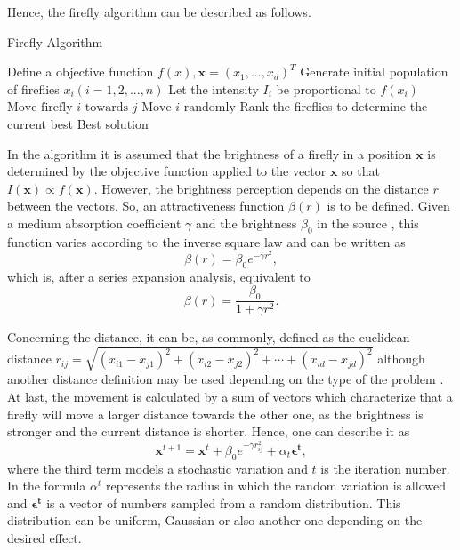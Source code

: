 \documentclass[tuberlin,cic,tc,openright,english,noabntcite,oneside]{iiufrgs}
\begin{document}
Hence, the firefly algorithm can be described as follows.
\begin{algorithm}[H]
\caption{Firefly Algorithm}
\begin{algorithmic}
\State Define a objective function $f(x), \mathbf{x}=(x_{1},...,x_{d})^{T}$
\State Generate initial population of fireflies $x_{i}(i=1,2,...,n)$
\State Let the intensity $I_{i}$ be proportional to $f(x_{i})$
				\State $\text{Move firefly }i\text{ towards }j$
			\EndIf
		\EndFor
	\EndFor
		\State $\text{Move }i\text{ randomly}$
	\EndIf
	\State Rank the fireflies to determine the current best
\EndWhile
\State \Return Best solution
\EndFunction
\end{algorithmic}
\end{algorithm}

In the algorithm it is assumed that the brightness of a firefly in a position $\mathbf{x}$ is determined by the objective function applied to the vector $\mathbf{x}$ so that $I(\mathbf{x}) \propto f(\mathbf{x})$. However, the brightness perception depends on the distance $r$ between the vectors. So, an attractiveness function $\beta(r)$ is to be defined. Given a medium absorption coefficient $\gamma$ and the brightness $\beta_{0}$ in the source , this function varies according to the inverse square law and can be written as
$$\beta(r) = \beta_{0}e^{-\gamma r^{2}},$$ which is, after a series expansion analysis, equivalent to
$$\beta(r) = \frac{\beta_{0}}{1 + \gamma r^{2}}.$$

Concerning the distance, it can be, as commonly, defined as the euclidean distance $r_{ij} = \sqrt{(x_{i1} - x_{j1})^{2}+(x_{i2} - x_{j2})^{2}+\cdots+(x_{id} - x_{jd})^{2}}$ although another distance definition may be used depending on the type of the problem \parencite[p. 193]{yang_efficiency_2012}. At last, the movement is calculated by a sum of vectors which characterize that a firefly will move a larger distance towards the other one, as the brightness is stronger and the current distance is shorter. Hence, one can describe it as
$$\mathbf{x}^{t+1} = \mathbf{x}^{t} + \beta_{0}e^{-\gamma r_{ij}^{2}} + \alpha_{t} \mathbf{\epsilon^{t}},$$
where the third term models a stochastic variation and $t$ is the iteration number. In the formula $\alpha^{t}$ represents the radius in which the random variation is allowed and $\mathbf{\epsilon^{t}}$ is a vector of numbers sampled from a random distribution. This distribution can be uniform, Gaussian or also another one depending on the desired effect.
\end{document}
